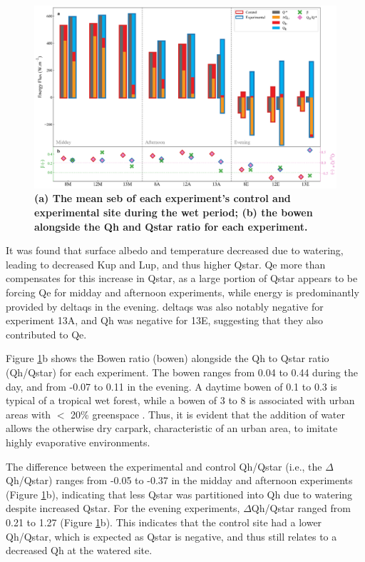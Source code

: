 \documentclass[final,3p,times,authoryear]{elsarticle}
\begin{document}
\begin{figure}
\centering
\includegraphics[trim={0 0 0 0},clip,scale=1.0]{pict017.png}
\caption{\bf (a) The mean \gls{seb} of each experiment's control and experimental site during the wet period; (b) the \gls{bowen} alongside the \gls{Qh} and \gls{Qstar} ratio for each experiment.}
 \label{fig:3.6}
\end{figure}

It was found that surface albedo and temperature decreased due to watering, leading to decreased \gls{Kup} and \gls{Lup}, and thus higher \gls{Qstar}. \gls{Qe} more than compensates for this increase in \gls{Qstar}, as a large portion of \gls{Qstar} appears to be forcing \gls{Qe} for midday and afternoon experiments, while energy is predominantly provided by \gls{deltaqs} in the evening. \gls{deltaqs} was also notably negative for experiment 13A, and \gls{Qh} was negative for 13E, suggesting that they also contributed to \gls{Qe}.

Figure \ref{fig:3.6}b shows the Bowen ratio (\gls{bowen}) alongside the \gls{Qh} to \gls{Qstar} ratio (\gls{Qh}/\gls{Qstar}) for each experiment. The \gls{bowen} ranges from 0.04 to 0.44 during the day, and from -0.07 to 0.11 in the evening. A daytime \gls{bowen} of 0.1 to 0.3 is typical of a tropical wet forest, while a \gls{bowen} of 3 to 8 is associated with urban areas with $<$ 20\% greenspace \citep{Oke2017}. Thus, it is evident that the addition of water allows the otherwise dry carpark, characteristic of an urban area, to imitate highly evaporative environments.

The difference between the experimental and control \gls{Qh}/\gls{Qstar} (i.e., the $\Delta$\gls{Qh}/\gls{Qstar}) ranges from -0.05 to -0.37 in the midday and afternoon experiments (Figure \ref{fig:3.6}b), indicating that less \gls{Qstar} was partitioned into \gls{Qh} due to watering despite increased \gls{Qstar}. For the evening experiments, $\Delta$\gls{Qh}/\gls{Qstar} ranged from 0.21 to 1.27 (Figure \ref{fig:3.6}b). This indicates that the control site had a lower \gls{Qh}/\gls{Qstar}, which is expected as \gls{Qstar} is negative, and thus still relates to a decreased \gls{Qh} at the watered site.
\end{document}
